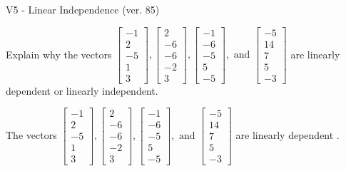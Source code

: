 \begin{exercise}
  \begin{exerciseTitle}V5 - Linear Independence (ver. 85)\end{exerciseTitle}
  \begin{exerciseStatement}
    Explain why the vectors \(\left[\begin{array}{r}
-1 \\
2 \\
-5 \\
1 \\
3
\end{array}\right] , \left[\begin{array}{r}
2 \\
-6 \\
-6 \\
-2 \\
3
\end{array}\right] , \left[\begin{array}{r}
-1 \\
-6 \\
-5 \\
5 \\
-5
\end{array}\right] , \text{ and } \left[\begin{array}{r}
-5 \\
14 \\
7 \\
5 \\
-3
\end{array}\right]\) are linearly dependent or linearly independent.	


  \end{exerciseStatement}
  \begin{exerciseAnswer}
   The vectors \(\left[\begin{array}{r}
-1 \\
2 \\
-5 \\
1 \\
3
\end{array}\right] , \left[\begin{array}{r}
2 \\
-6 \\
-6 \\
-2 \\
3
\end{array}\right] , \left[\begin{array}{r}
-1 \\
-6 \\
-5 \\
5 \\
-5
\end{array}\right] , \text{ and } \left[\begin{array}{r}
-5 \\
14 \\
7 \\
5 \\
-3
\end{array}\right]\) are 
  	 linearly dependent  .
  


  \end{exerciseAnswer}
\end{exercise}
